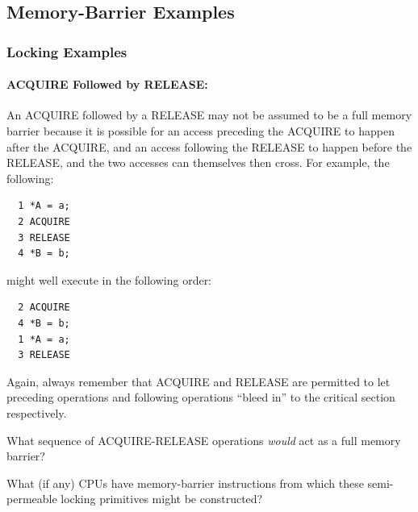 \subsection{Memory-Barrier Examples}
\label{sec:advsync:Memory-Barrier Examples}

\subsubsection{Locking Examples}

\paragraph{ACQUIRE Followed by RELEASE:}
An ACQUIRE followed by a RELEASE may not be assumed to be a full memory barrier
because it is possible for an access preceding the ACQUIRE to happen after the
ACQUIRE, and an access following the RELEASE to happen before the RELEASE, and the
two accesses can themselves then cross.
For example, the following:

\vspace{5pt}
\begin{minipage}[t]{\columnwidth}
\scriptsize
\begin{verbatim}
  1 *A = a;
  2 ACQUIRE
  3 RELEASE
  4 *B = b;
\end{verbatim}
\vspace{1pt}
\end{minipage}
%
might well execute in the following order:

\vspace{5pt}
\begin{minipage}[t]{\columnwidth}
\scriptsize
\begin{verbatim}
  2 ACQUIRE
  4 *B = b;
  1 *A = a;
  3 RELEASE
\end{verbatim}
\end{minipage}
\vspace{5pt}

Again, always remember that ACQUIRE and RELEASE are permitted to let preceding
operations and following operations ``bleed in'' to the critical section
respectively.

\QuickQuiz{}
	What sequence of ACQUIRE-RELEASE operations \emph{would}
	act as a full memory barrier?
 \QuickQuizEnd

\QuickQuiz{}
	What (if any) CPUs have memory-barrier instructions
	from which these semi-permeable locking primitives might
	be constructed?
 \QuickQuizEnd

